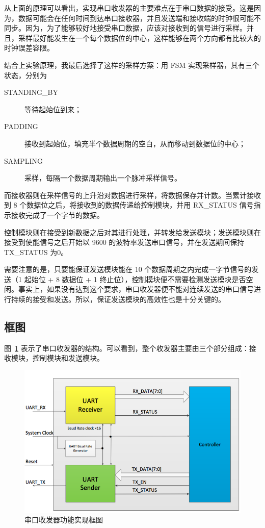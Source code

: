 \documentclass[11pt,a4paper]{article}
\begin{document}
从上面的原理可以看出，实现串口收发器的主要难点在于串口数据的接受。这是因为，数据可能会在任何时间到达串口接收器，并且发送端和接收端的时钟很可能不同步。因为，为了能够较好地接受串口数据，应该对接收到的信号进行采样。并且，采样最好能发生在一个每个数据位的中心，这样能够在两个方向都有比较大的时钟误差容限。

结合上实验原理，我最后选择了这样的采样方案：用 FSM 实现采样器，其有三个状态，分别为
\begin{description}
  \item[STANDING\_BY] 等待起始位到来；
  \item[PADDING] 接收到起始位，填充半个数据周期的空白，从而移动到数据位的中心；
  \item[SAMPLING] 采样，每隔一个数据周期输出一个脉冲采样信号。
\end{description}

而接收器则在采样信号的上升沿对数据进行采样，将数据保存并计数。当累计接收到 8 个数据位之后，将接收到的数据传递给控制模块，并用  RX\_STATUS 信号指示接收完成了一个字节的数据。

控制模块则在接受到新数据之后对其进行处理，并转发给发送模块；发送模块则在接受到使能信号之后开始以 9600 的波特率发送串口信号，并在发送期间保持 TX\_STATUS 为0。

需要注意的是，只要能保证发送模块能在 10 个数据周期之内完成一字节信号的发送（1 起始位 + 8 数据位 + 1 终止位），控制模块便不需要检测发送模块是否空闲。事实上，如果没有达到这个要求，串口收发器便不能对连续发送的串口信号进行持续的接受和发送。所以，保证发送模块的高效性也是十分关键的。

\subsection{框图}
图~\ref{fig:串口收发器功能实现框图} 表示了串口收发器的结构。可以看到，整个收发器主要由三个部分组成：接收模块，控制模块和发送模块。

\begin{figure}[htb]
  \centering
    \includegraphics[width=\textwidth]{structure}
  \caption{串口收发器功能实现框图}
  \label{fig:串口收发器功能实现框图}
\end{figure}
\end{document}
